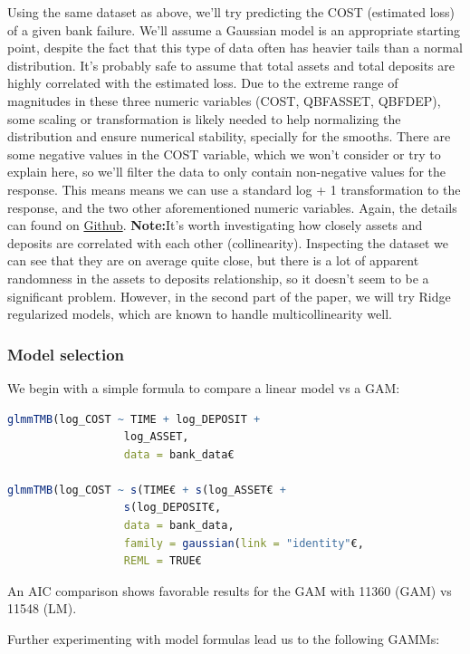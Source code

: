 \documentclass[12pt, twoside,hidelinks]{article}
\theoremstyle{definition}
\numberwithin{equation}{section}
\begin{document}
Using the same dataset as above, we'll try predicting the COST (estimated loss) of a given bank failure. We'll assume a Gaussian model is an appropriate starting point, despite the fact that this type of data often has heavier tails than a normal distribution. It's probably safe to assume that total assets and total deposits are highly correlated with the estimated loss. Due to the extreme range of magnitudes in these three numeric variables (COST, QBFASSET, QBFDEP), some scaling or transformation is likely needed to help normalizing the distribution and ensure numerical stability, specially for the smooths. There are some negative values in the COST variable, which we won't consider or try to explain here, so we'll filter the data to only contain non-negative values for the response. This means means we can use a standard log + 1 transformation to the response, and the two other aforementioned numeric variables. Again, the details can found on \href{https://github.com/AllInCade/MasterProject}{Github}. 
\textbf{Note:}It's worth investigating how closely assets and deposits are correlated with each other (collinearity). Inspecting the dataset we can see that they are on average quite close, but there is a lot of apparent randomness in the assets to deposits relationship, so it doesn't seem to be a significant problem. However, in the second part of the paper, we will try Ridge regularized models, which are known to handle multicollinearity well.

\subsubsection{Model selection}

We begin with a simple formula to compare a linear model vs a GAM: 

\begin{lstlisting}[language=R]
glmmTMB(log_COST ~ TIME + log_DEPOSIT + 
                  log_ASSET, 
                  data = bank_data€
  
glmmTMB(log_COST ~ s(TIME€ + s(log_ASSET€ +     
                  s(log_DEPOSIT€,
                  data = bank_data, 
                  family = gaussian(link = "identity"€,
                  REML = TRUE€ 
\end{lstlisting}

An AIC comparison shows favorable results for the GAM with 11360 (GAM) vs 11548 (LM). 
\newline

Further experimenting with model formulas lead us to the following GAMMs: 
\end{document}
